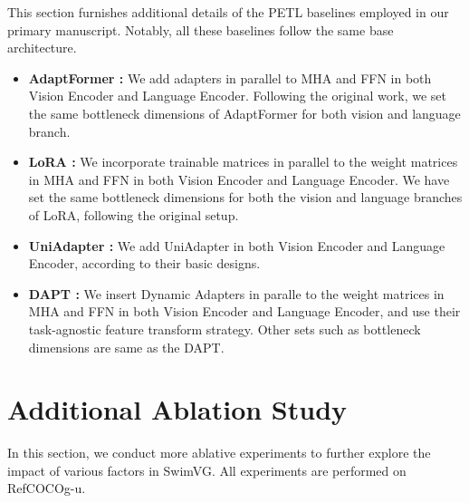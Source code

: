 This section furnishes additional details of the PETL baselines employed in our primary manuscript. Notably, all these baselines follow the same base architecture.
\begin{itemize}

    \item \textbf{AdaptFormer \cite{chen2022adaptformer}:} We add adapters in parallel to MHA and FFN in both Vision Encoder and Language Encoder. Following the original work, we set the same bottleneck dimensions of AdaptFormer for both vision and language branch.
    
    \item \textbf{LoRA \cite{hu2021lora}:} We incorporate trainable matrices in parallel to the weight matrices in MHA and FFN in both Vision Encoder and Language Encoder. 
    We have set the same bottleneck dimensions for both the vision and language branches of LoRA, following the original setup.

    \item \textbf{UniAdapter \cite{lu2024uniadapter}:} We add UniAdapter  in both Vision Encoder and Language Encoder, according to their basic designs. 

    \item \textbf{DAPT \cite{zhou2024dynamic}:} We insert Dynamic Adapters in paralle to the weight matrices in MHA and FFN in both Vision Encoder and Language Encoder, and use their task-agnostic feature transform strategy. Other sets such as bottleneck dimensions are same as the DAPT.

   

    
\end{itemize}


\section{Additional Ablation Study}
\label{sec:addional exp}

In this section, we conduct more ablative experiments to further explore the impact of various factors in SwimVG. All experiments are performed on RefCOCOg-u. 


